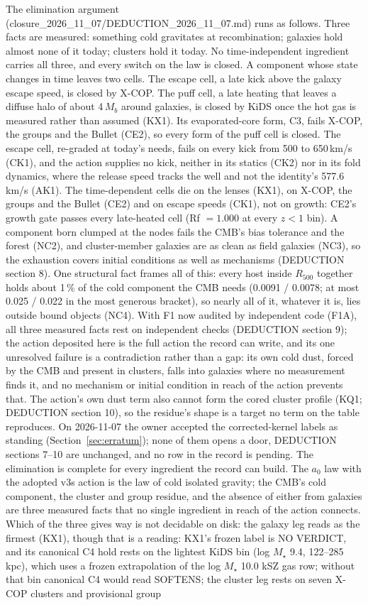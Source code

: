 \documentclass[10pt]{article}
\begin{document}
The elimination argument (closure\_2026\_11\_07/DEDUCTION\_2026\_11\_07.md) runs as follows. Three facts are measured: something cold gravitates at recombination; galaxies hold almost none of it today; clusters hold it today. No time-independent ingredient carries all three, and every switch on the law is closed. A component whose state changes in time leaves two cells. The escape cell, a late kick above the galaxy escape speed, is closed by X-COP. The puff cell, a late heating that leaves a diffuse halo of about 4\,$M_b$ around galaxies, is closed by KiDS once the hot gas is measured rather than assumed (KX1). Its evaporated-core form, C3, fails X-COP, the groups and the Bullet (CE2), so every form of the puff cell is closed. The escape cell, re-graded at today's needs, fails on every kick from 500 to 650\,km/s (CK1), and the action supplies no kick, neither in its statics (CK2) nor in its fold dynamics, where the release speed tracks the well and not the identity's 577.6\,km/s (AK1). The time-dependent cells die on the lenses (KX1), on X-COP, the groups and the Bullet (CE2) and on escape speeds (CK1), not on growth: CE2's growth gate passes every late-heated cell (Rf $=1.000$ at every $z<1$ bin). A component born clumped at the nodes fails the CMB's bias tolerance and the forest (NC2), and cluster-member galaxies are as clean as field galaxies (NC3), so the exhaustion covers initial conditions as well as mechanisms (DEDUCTION section 8). One structural fact frames all of this: every host inside $R_{500}$ together holds about 1\,\% of the cold component the CMB needs (0.0091 / 0.0078; at most 0.025 / 0.022 in the most generous bracket), so nearly all of it, whatever it is, lies outside bound objects (NC4). With F1 now audited by independent code (F1A), all three measured facts rest on independent checks (DEDUCTION section 9); the action deposited here is the full action the record can write, and its one unresolved failure is a contradiction rather than a gap: its own cold dust, forced by the CMB and present in clusters, falls into galaxies where no measurement finds it, and no mechanism or initial condition in reach of the action prevents that. The action's own dust term also cannot form the cored cluster profile (KQ1; DEDUCTION section 10), so the residue's shape is a target no term on the table reproduces. On 2026-11-07 the owner accepted the corrected-kernel labels as standing (Section~\ref{sec:erratum}); none of them opens a door, DEDUCTION sections 7--10 are unchanged, and no row in the record is pending. The elimination is complete for every ingredient the record can build. The $a_0$ law with the adopted v3s action is the law of cold isolated gravity; the CMB's cold component, the cluster and group residue, and the absence of either from galaxies are three measured facts that no single ingredient in reach of the action connects. Which of the three gives way is not decidable on disk: the galaxy leg reads as the firmest (KX1), though that is a reading: KX1's frozen label is NO VERDICT, and its canonical C4 hold rests on the lightest KiDS bin (log $M_\star$ 9.4, 122--285\,kpc), which uses a frozen extrapolation of the log $M_\star$ 10.0 kSZ gas row; without that bin canonical C4 would read SOFTENS; the cluster leg rests on seven X-COP clusters and provisional group 
\end{document}
